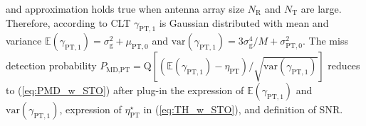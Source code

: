 \documentclass[journal]{IEEEtran}
\newcommand{\tx}[0]{\text{T}}
\newcommand{\rx}[0]{\text{R}}
\newcommand{\Nb}[0]{N_{\text{B}}}
\newcommand{\Nc}[0]{N_{\text{c}}}
\newcommand{\sigman}[0]{\sigma_{\text{n}}}
\newcommand{\var}[0]{\mathrm{var}}
\newcommand{\Q}[0]{\mathrm{Q}}
\begin{document}
and approximation holds true when antenna array size $N_{\rx}$ and $N_{\tx}$ are large.
Therefore, according to CLT $\gamma_{\text{PT},1}$ is Gaussian distributed with mean and variance
$\mathbb{E}(\gamma_{\text{PT},1}) = \sigma_{\text{g}}^2 + \mu_{\text{PT},0}$ and $\var(\gamma_{\text{PT},1}) =  3\sigma_{\text{g}}^4/M + \sigma^2_{\text{PT},0}.$
The miss detection probability 
$P_{\text{MD,PT}} = \Q[(\mathbb{E}(\gamma_{\text{PT},1}) - \eta_{\text{PT}})/\sqrt{\var(\gamma_{\text{PT},1})}]$
reduces to (\ref{eq:PMD_w_STO}) after plug-in the expression of $\mathbb{E}(\gamma_{\text{PT},1})$ and $\var(\gamma_{\text{PT},1})$, expression of $\eta^{\star}_{\text{PT}}$ in (\ref{eq:TH_w_STO}), and definition of SNR.
%
%



\end{document}
